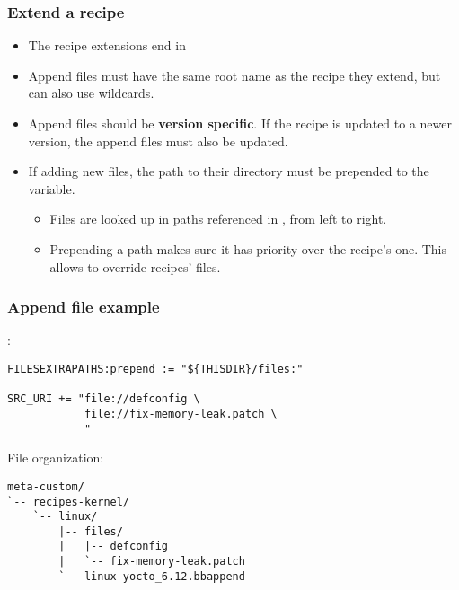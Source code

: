 \begin{frame}[fragile]
  \frametitle{Extend a recipe}
  \begin{itemize}
    \item The recipe extensions end in 
    \item Append files must have the same root name as the recipe they
          extend, but can also use wildcards.
    \item Append files should be {\bf version specific}. If the recipe
      is updated to a newer version, the append files must also be
      updated.
    \item If adding new files, the path to their directory must
          be prepended to the  variable.
    \begin{itemize}
      \item Files are looked up in paths referenced in
            , from left to right.
      \item Prepending a path makes sure it has priority over the recipe's
            one. This allows to override recipes' files.
    \end{itemize}
  \end{itemize}
\end{frame}

\begin{frame}[fragile]
  \frametitle{Append file example}
  :
  \begin{block}{}
    \begin{verbatim}
FILESEXTRAPATHS:prepend := "${THISDIR}/files:"

SRC_URI += "file://defconfig \
            file://fix-memory-leak.patch \
            "
    \end{verbatim}
  \end{block}
  File organization:
  \begin{block}{}
    \begin{verbatim}
meta-custom/
`-- recipes-kernel/
    `-- linux/
        |-- files/
        |   |-- defconfig
        |   `-- fix-memory-leak.patch
        `-- linux-yocto_6.12.bbappend
    \end{verbatim}
  \end{block}
\end{frame}


